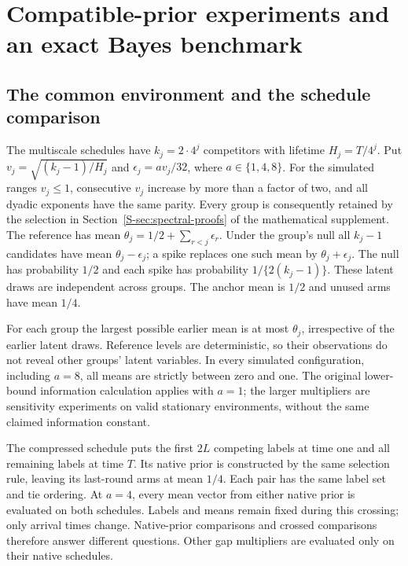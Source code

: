 \section{Compatible-prior experiments and an exact Bayes benchmark}\label{sec:bayes-experiment-details}
\subsection{The common environment and the schedule comparison}
The multiscale schedules have $k_j=2\cdot4^j$ competitors with lifetime $H_j=T/4^j$. Put $v_j=\sqrt{(k_j-1)/H_j}$ and $\epsilon_j=av_j/32$, where $a\in\{1,4,8\}$. For the simulated ranges $v_j\le1$, consecutive $v_j$ increase by more than a factor of two, and all dyadic exponents have the same parity. Every group is consequently retained by the selection in Section~\ref{S-sec:spectral-proofs} of the mathematical supplement. The reference has mean $\theta_j=1/2+\sum_{r<j}\epsilon_r$. Under the group's null all $k_j-1$ candidates have mean $\theta_j-\epsilon_j$; a spike replaces one such mean by $\theta_j+\epsilon_j$. The null has probability $1/2$ and each spike has probability $1/\{2(k_j-1)\}$. These latent draws are independent across groups. The anchor mean is $1/2$ and unused arms have mean $1/4$.

For each group the largest possible earlier mean is at most $\theta_j$, irrespective of the earlier latent draws. Reference levels are deterministic, so their observations do not reveal other groups' latent variables. In every simulated configuration, including $a=8$, all means are strictly between zero and one. The original lower-bound information calculation applies with $a=1$; the larger multipliers are sensitivity experiments on valid stationary environments, without the same claimed information constant.

The compressed schedule puts the first $2L$ competing labels at time one and all remaining labels at time $T$. Its native prior is constructed by the same selection rule, leaving its last-round arms at mean $1/4$. Each pair has the same label set and tie ordering. At $a=4$, every mean vector from either native prior is evaluated on both schedules. Labels and means remain fixed during this crossing; only arrival times change. Native-prior comparisons and crossed comparisons therefore answer different questions. Other gap multipliers are evaluated only on their native schedules.

